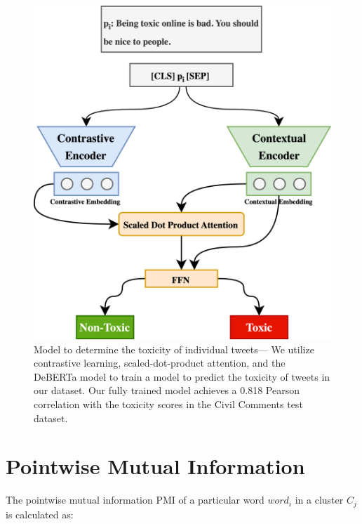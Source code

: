 \begin{figure}
\begin{minipage}[l]{0.5\textwidth}
\includegraphics[width=1\columnwidth]{figures/toxicity_classification.drawio.png} 
\end{minipage}
\begin{minipage}[l]{0.35\textwidth}
\caption{{Model to determine the toxicity of individual tweets}--- We utilize contrastive learning, scaled-dot-product attention, and the DeBERTa model to train a model to predict the toxicity of tweets in our dataset. Our fully trained model achieves a 0.818 Pearson correlation with the toxicity scores in the Civil Comments test dataset. \label{fig:toxicity-twitter-model}}
\end{minipage}

\end{figure}


\section{Pointwise Mutual Information\label{sec:pmi} }

The pointwise mutual information PMI of a particular word $word_i$ in a cluster $C_j$ is calculated as:

